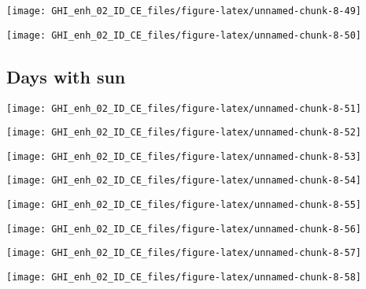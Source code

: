 \documentclass[
  10pt,
  a4paper,oneside]{article}
\begin{document}
\begin{center}\texttt{[image: GHI\_enh\_02\_ID\_CE\_files/figure-latex/unnamed-chunk-8-49]} \end{center}

\begin{center}\texttt{[image: GHI\_enh\_02\_ID\_CE\_files/figure-latex/unnamed-chunk-8-50]} \end{center}

\FloatBarrier

\hypertarget{days-with-sun}{%
\subsection{Days with sun}\label{days-with-sun}}

\begin{center}\texttt{[image: GHI\_enh\_02\_ID\_CE\_files/figure-latex/unnamed-chunk-8-51]} \end{center}

\begin{center}\texttt{[image: GHI\_enh\_02\_ID\_CE\_files/figure-latex/unnamed-chunk-8-52]} \end{center}

\begin{center}\texttt{[image: GHI\_enh\_02\_ID\_CE\_files/figure-latex/unnamed-chunk-8-53]} \end{center}

\begin{center}\texttt{[image: GHI\_enh\_02\_ID\_CE\_files/figure-latex/unnamed-chunk-8-54]} \end{center}

\begin{center}\texttt{[image: GHI\_enh\_02\_ID\_CE\_files/figure-latex/unnamed-chunk-8-55]} \end{center}

\begin{center}\texttt{[image: GHI\_enh\_02\_ID\_CE\_files/figure-latex/unnamed-chunk-8-56]} \end{center}

\begin{center}\texttt{[image: GHI\_enh\_02\_ID\_CE\_files/figure-latex/unnamed-chunk-8-57]} \end{center}

\begin{center}\texttt{[image: GHI\_enh\_02\_ID\_CE\_files/figure-latex/unnamed-chunk-8-58]} \end{center}
\end{document}
